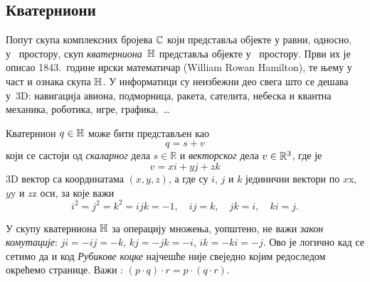 \subsection{Кватерниони}

\def\uv{{u}}
\def\vp{{v}}
\def\norm#1{{\vert#1\vert}}
\def\con#1{{\bar#1}}

Попут скупа комплексних бројева ${\mathbb C}$ који представља објекте у равни, односно, у~ простору,
скуп {\sl кватерниона\/}~${\mathbb H}$ представља објекте у~ простору. 
Први их је описао 1843.\ године ирски математичар
 (William Rowan Hamilton), те њему у част и ознака скупа
${\mathbb H}$.
У информатици су неизбежни део свега што се дешава у~3D:
навигација авиона, подморница, ракета, сателита,
небеска и квантна механика, роботика, игре, графика,~\dots

\medskip

Кватернион $q\in{\mathbb H}$ може бити представљен као 
\begin{equation}
    q=s+\vp
\end{equation}
који се састоји од {\sl скаларног\/} дела $s\in{\mathbb R}$ и {\sl векторског\/} дела 
$\vp\in\Rset^3$, где је
\begin{equation}
    \vp=xi+yj+zk
\end{equation}
3D вектор са координатама $(x,y,z)$, 
а где су $i$, $j$ и $k$ јединични вектори 
по $x$\idxaxis x, $y$\idxaxis y и $z$\idxaxis z оси, за које важи
\begin{equation}\label{eq:qunits}
    i^2=j^2=k^2=ijk=-1,\quad
    ij=k,\quad jk=i,\quad ki=j. 
\end{equation}

\danger 
У скупу кватерниона ${\mathbb H}$ за операцију множења, уопштено, не важи {\sl закон комутације}:
$ji=-ij=-k$, $kj=-jk=-i$, $ik=-ki=-j$.
Ово је логично кад се сетимо да и код
{\sl Рубикове коцке\/} 
најчешће није свеједно којим редоследом окрећемо странице.
Важи {\sl {}}: $(p\cdot q)\cdot r=p\cdot(q\cdot r)$.

\medskip

